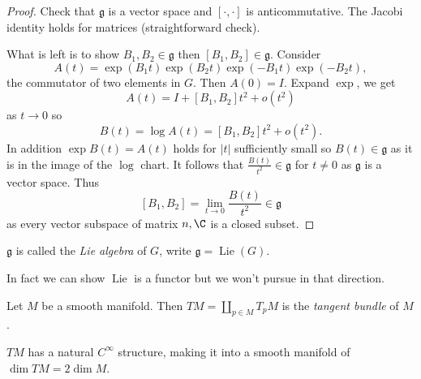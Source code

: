 \documentclass[a4paper]{article}
\DeclareMathOperator{\Lie}{Lie} %
\begin{document}
\begin{proof}
  Check that \(\mathfrak g\) is a vector space and \([\cdot, \cdot]\) is anticommutative. The Jacobi identity holds for matrices (straightforward check).

  What is left is to show \(B_1, B_2 \in \mathfrak g\) then \([B_1, B_2] \in \mathfrak g\). Consider
  \[
    A(t) = \exp (B_1 t) \exp (B_2 t) \exp(-B_1t) \exp (-B_2t),
  \]
  the commutator of two elements in \(G\). Then \(A(0) = I\). Expand \(\exp\), we get
  \[
    A(t) = I + [B_1, B_2] t^2 + o(t^2)
  \]
  as \(t \to 0\) so
  \[
    B(t) = \log A(t) = [B_1, B_2] t^2 + o(t^2).
  \]
  In addition \(\exp B(t) = A(t)\) holds for \(|t|\) sufficiently small so \(B(t) \in \mathfrak g\) as it is in the image of the \(\log\) chart. It follows that \(\frac{B(t)}{t^2} \in \mathfrak g\) for \(t \neq 0\) as \(\mathfrak g\) is a vector space. Thus
  \[
    [B_1, B_2] = \lim_{t \to 0} \frac{B(t)}{t^2} \in \mathfrak g
  \]
  as every vector subspace of matrix \(n, \C\) is a closed subset.
\end{proof}


\begin{definition}
  \(\mathfrak g\) is called the \emph{Lie algebra} of \(G\), write \(\mathfrak g = \Lie(G)\).
\end{definition}

In fact we can show \(\Lie\) is a functor but we won't pursue in that direction.

\begin{definition}
  Let \(M\) be a smooth manifold. Then \(TM = \coprod_{p \in M} T_pM\) is the \emph{tangent bundle} of \(M\).
\end{definition}

\begin{theorem}
  \(TM\) has a natural \(C^\infty\) structure, making it into a smooth manifold of \(\dim TM = 2 \dim M\).
\end{theorem}
\end{document}
